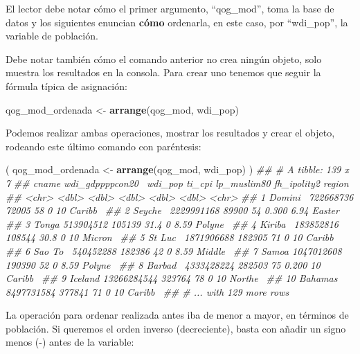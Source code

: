 \documentclass[]{book}
\newenvironment{Shaded}{\begin{snugshade}}{\end{snugshade}}
\newcommand{\CommentTok}[1]{\textcolor[rgb]{0.56,0.35,0.01}{\textit{#1}}}
\newcommand{\KeywordTok}[1]{\textcolor[rgb]{0.13,0.29,0.53}{\textbf{#1}}}
\newcommand{\NormalTok}[1]{#1}
\newcommand{\StringTok}[1]{\textcolor[rgb]{0.31,0.60,0.02}{#1}}
\begin{document}
El lector debe notar cómo el primer argumento, ``qog\_mod'', toma la
base de datos y los siguientes enuncian \textbf{cómo} ordenarla, en este
caso, por ``wdi\_pop'', la variable de población.

Debe notar también cómo el comando anterior no crea ningún objeto, solo
muestra los resultados en la consola. Para crear uno tenemos que seguir
la fórmula típica de asignación:

\begin{Shaded}
\begin{Highlighting}[]
\NormalTok{qog_mod_ordenada <-}\StringTok{ }\KeywordTok{arrange}\NormalTok{(qog_mod, wdi_pop)}
\end{Highlighting}
\end{Shaded}

Podemos realizar ambas operaciones, mostrar los resultados y crear el
objeto, rodeando este último comando con paréntesis:

\begin{Shaded}
\begin{Highlighting}[]
\NormalTok{( qog_mod_ordenada <-}\StringTok{ }\KeywordTok{arrange}\NormalTok{(qog_mod, wdi_pop) )}
\CommentTok{## # A tibble: 139 x 7}
\CommentTok{##    cname   wdi_gdppppcon20~ wdi_pop ti_cpi lp_muslim80 fh_ipolity2 region }
\CommentTok{##    <chr>              <dbl>   <dbl>  <dbl>       <dbl>       <dbl> <chr>  }
\CommentTok{##  1 Domini~        722668736   72005   58         0           10    Caribb~}
\CommentTok{##  2 Seyche~       2229991168   89900   54         0.300        6.94 Easter~}
\CommentTok{##  3 Tonga          513904512  105139   31.4       0            8.59 Polyne~}
\CommentTok{##  4 Kiriba~        183852816  108544   30.8       0           10    Micron~}
\CommentTok{##  5 St Luc~       1871906688  182305   71         0           10    Caribb~}
\CommentTok{##  6 Sao To~        540452288  182386   42         0            8.59 Middle~}
\CommentTok{##  7 Samoa         1047012608  190390   52         0            8.59 Polyne~}
\CommentTok{##  8 Barbad~       4333428224  282503   75         0.200       10    Caribb~}
\CommentTok{##  9 Iceland      13266284544  323764   78         0           10    Northe~}
\CommentTok{## 10 Bahamas       8497731584  377841   71         0           10    Caribb~}
\CommentTok{## # ... with 129 more rows}
\end{Highlighting}
\end{Shaded}

La operación para ordenar realizada antes iba de menor a mayor, en
términos de población. Si queremos el orden inverso (decreciente), basta
con añadir un signo menos (-) antes de la variable:
\end{document}
